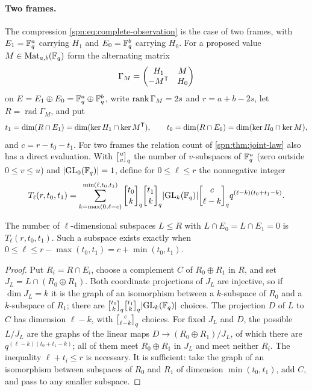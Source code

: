 \paragraph{Two frames.}
The compression \eqref{spn:eq:complete-observation} is the case of two frames, with $E_1=\mathbb{F}_q^a$
carrying $H_1$ and $E_0=\mathbb{F}_q^b$ carrying $H_0$. For a proposed value $M\in\operatorname{Mat}_{a,b}(\mathbb{F}_q)$ form the alternating
matrix
\begin{equation}\label{spn:eq:combined-gram}
 \Gamma_M=\begin{pmatrix}H_1&M\\-M^{\mathsf{T}}&H_0\end{pmatrix}
\end{equation}
on $E=E_1\oplus E_0=\mathbb{F}_q^a\oplus\mathbb{F}_q^b$, write $\operatorname{rank}\Gamma_M=2s$ and
$r=a+b-2s$, let $R=\operatorname{rad}\Gamma_M$, and put
\[
 t_1=\dim(R\cap E_1)=\dim(\ker H_1\cap\ker M^{\mathsf{T}}),\qquad
 t_0=\dim(R\cap E_0)=\dim(\ker H_0\cap\ker M),
\]
and $c=r-t_0-t_1$. For two frames the relation count of \cref{spn:thm:joint-law} also has a direct
evaluation. With $\spnqbin uvq$ the number of $v$-subspaces of $\mathbb{F}_q^u$ (zero outside
$0\le v\le u$) and $\lvert\operatorname{GL}_0(\mathbb{F}_q)\rvert=1$, define for $0\le\ell\le r$ the
nonnegative integer
\begin{equation}\label{spn:eq:T-count}
 T_\ell(r,t_0,t_1)=\sum_{k=\max(0,\ell-c)}^{\min(\ell,t_0,t_1)}
 \spnqbin{t_0}kq\spnqbin{t_1}kq\abs{\GL_k(\F_q)}\spnqbin{c}{\ell-k}q
 q^{(\ell-k)(t_0+t_1-k)} .
\end{equation}

\begin{lemma}\label{spn:lem:transverse}
The number of $\ell$-dimensional subspaces $L\le R$ with
$L\cap E_0=L\cap E_1=0$ is $T_\ell(r,t_0,t_1)$. Such a subspace exists exactly
when $0\le\ell\le r-\max(t_0,t_1)=c+\min(t_0,t_1)$.
\end{lemma}

\begin{proof}
Put $R_i=R\cap E_i$, choose a complement $C$ of $R_0\oplus R_1$ in $R$, and set
$J_L=L\cap(R_0\oplus R_1)$. Both coordinate projections of $J_L$ are
injective, so if $\dim J_L=k$ it is the graph of an isomorphism between a
$k$-subspace of $R_0$ and a $k$-subspace of $R_1$; there are
$\spnqbin{t_0}kq\spnqbin{t_1}kq\abs{\GL_k(\F_q)}$ choices. The projection $D$
of $L$ to $C$ has dimension $\ell-k$, with $\spnqbin c{\ell-k}q$ choices. For
fixed $J_L$ and $D$, the possible $L/J_L$ are the graphs of the linear maps
$D\to(R_0\oplus R_1)/J_L$, of which there are $q^{(\ell-k)(t_0+t_1-k)}$; all of
them meet $R_0\oplus R_1$ in $J_L$ and meet neither $R_i$. The inequality
$\ell+t_i\le r$ is necessary. It is sufficient: take the graph of an
isomorphism between subspaces of $R_0$ and $R_1$ of dimension
$\min(t_0,t_1)$, add $C$, and pass to any smaller subspace.
\end{proof}

